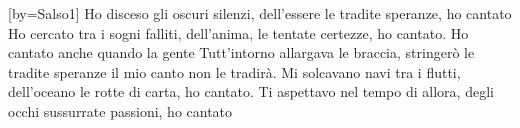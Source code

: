 [by={Salso1}]
\beginverse
Ho disceso gli oscuri silenzi,
dell'essere
le tradite speranze,
ho cantato
Ho cercato tra i sogni falliti,
dell'anima,
le tentate certezze,
ho cantato.
\endverse
\beginchorus
Ho cantato anche quando la gente
Tutt'intorno allargava le braccia,
stringerò le tradite speranze
il mio canto non le tradirà.
\endchorus
\beginverse
Mi solcavano navi tra i flutti,
dell'oceano
le rotte di carta,
ho cantato.
Ti aspettavo nel tempo di allora,
degli occhi
sussurrate passioni,
ho cantato
\endverse
\endsong
